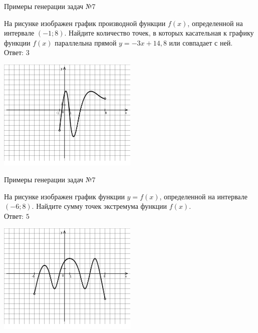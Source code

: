 \documentclass[aspectratio=169]{beamer}
\begin{document}
\begin{frame}{Примеры генерации задач №7}
    
    \begin{multicols}{2}
        На рисунке изображен график производной функции $f (x)$, определенной на интервале $ (-1; 8)$. Найдите количество точек, в которых касательная к графику функции $f (x)$ параллельна прямой $y=-3x+ 14{,}8 $ или совпадает с ней.\\

        Ответ: $3$

        \includegraphics[width=0.5\textwidth]{images/776525944899729n0}
      \end{multicols}
        
   
\end{frame}

\begin{frame}{Примеры генерации задач №7}
    \begin{multicols}{2}
        На рисунке изображен график функции $y=f (x)$, определенной на интервале $ (-6;8)$. Найдите сумму точек экстремума функции $f (x)$.\\

        Ответ: $5$

        \includegraphics[width=0.5\textwidth]{images/020693809529216n0}
    \end{multicols}
\end{frame}
\end{document}
